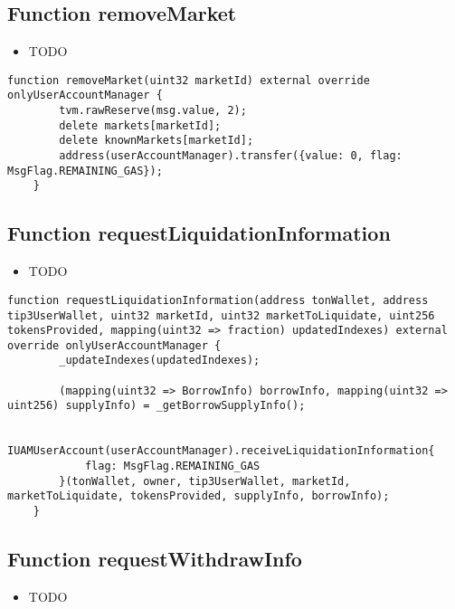\subsection{Function removeMarket}

\noindent\begin{itemize}
\item TODO
\end{itemize}

\begin{lstlisting}[firstnumber=283]
    function removeMarket(uint32 marketId) external override onlyUserAccountManager {
        tvm.rawReserve(msg.value, 2);
        delete markets[marketId];
        delete knownMarkets[marketId];
        address(userAccountManager).transfer({value: 0, flag: MsgFlag.REMAINING_GAS});
    }
\end{lstlisting}

\subsection{Function requestLiquidationInformation}

\noindent\begin{itemize}
\item TODO
\end{itemize}

\begin{lstlisting}[firstnumber=293]
    function requestLiquidationInformation(address tonWallet, address tip3UserWallet, uint32 marketId, uint32 marketToLiquidate, uint256 tokensProvided, mapping(uint32 => fraction) updatedIndexes) external override onlyUserAccountManager {
        _updateIndexes(updatedIndexes);

        (mapping(uint32 => BorrowInfo) borrowInfo, mapping(uint32 => uint256) supplyInfo) = _getBorrowSupplyInfo();

        IUAMUserAccount(userAccountManager).receiveLiquidationInformation{
            flag: MsgFlag.REMAINING_GAS
        }(tonWallet, owner, tip3UserWallet, marketId, marketToLiquidate, tokensProvided, supplyInfo, borrowInfo);
    }
\end{lstlisting}

\subsection{Function requestWithdrawInfo}

\noindent\begin{itemize}
\item TODO
\end{itemize}


